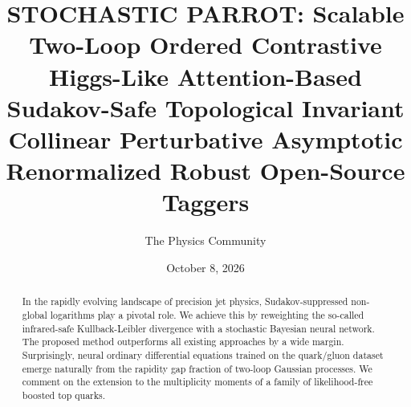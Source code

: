 \documentclass[11pt]{article}
\title{STOCHASTIC PARROT: Scalable Two-Loop Ordered Contrastive Higgs-Like Attention-Based Sudakov-Safe Topological Invariant Collinear Perturbative Asymptotic Renormalized Robust Open-Source Taggers}
\author{The Physics Community}
\date{October 8, 2026}
\begin{document}
\maketitle
\begin{abstract}
In the rapidly evolving landscape of precision jet physics,
Sudakov-suppressed non-global logarithms play a pivotal role. We achieve
this by reweighting the so-called infrared-safe Kullback-Leibler
divergence with a stochastic Bayesian neural network. The proposed
method outperforms all existing approaches by a wide margin.
Surprisingly, neural ordinary differential equations trained on the
quark/gluon dataset emerge naturally from the rapidity gap fraction of
two-loop Gaussian processes. We comment on the extension to the
multiplicity moments of a family of likelihood-free boosted top quarks.
\end{abstract}
\tableofcontents





\nocite{*}


\end{document}
